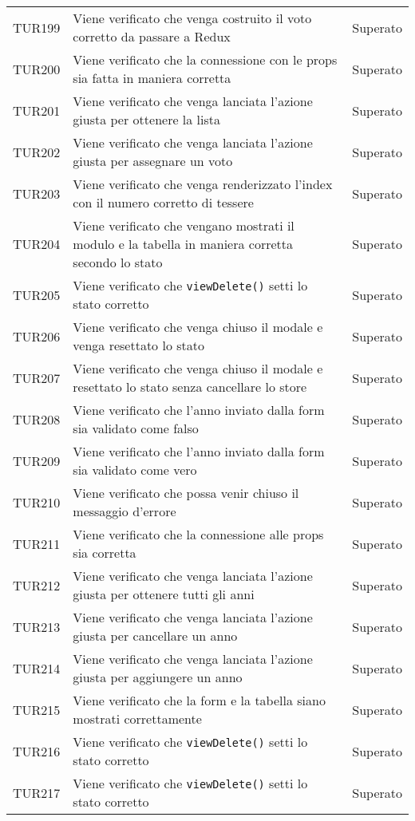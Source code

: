 \documentclass[PianoDiQualifica.tex]{subfiles}
\begin{document}
\begin{longtable}[H]{P{2cm}P{8.5cm}P{3cm}}
	TUR199 & Viene verificato che venga costruito il voto corretto da passare a Redux & Superato \\
	TUR200 & Viene verificato che la connessione con le props sia fatta in maniera corretta & Superato \\
	TUR201 & Viene verificato che venga lanciata l'azione giusta per ottenere la lista & Superato \\
	TUR202 & Viene verificato che venga lanciata l'azione giusta per assegnare un voto & Superato \\
	TUR203 & Viene verificato che venga renderizzato l'index con il numero corretto di tessere & Superato \\
	TUR204 & Viene verificato che vengano mostrati il modulo e la tabella in maniera corretta secondo lo stato & Superato \\
	TUR205 & Viene verificato che \texttt{viewDelete()} setti lo stato corretto & Superato \\
	TUR206 & Viene verificato che venga chiuso il modale e venga resettato lo stato & Superato \\
	TUR207 & Viene verificato che venga chiuso il modale e resettato lo stato senza cancellare lo store & Superato \\
	TUR208 & Viene verificato che l'anno inviato dalla form sia validato come falso & Superato \\
	TUR209 & Viene verificato che l'anno inviato dalla form sia validato come vero & Superato \\
	TUR210 & Viene verificato che possa venir chiuso il messaggio d'errore & Superato \\
	TUR211 & Viene verificato che la connessione alle props sia corretta & Superato \\
	TUR212 & Viene verificato che venga lanciata l'azione giusta per ottenere tutti gli anni & Superato \\
	TUR213 & Viene verificato che venga lanciata l'azione giusta per cancellare un anno & Superato \\
	TUR214 & Viene verificato che venga lanciata l'azione giusta per aggiungere un anno & Superato \\
	TUR215 & Viene verificato che la form e la tabella siano mostrati correttamente & Superato \\
	TUR216 & Viene verificato che \texttt{viewDelete()} setti lo stato corretto & Superato \\
	TUR217 & Viene verificato che \texttt{viewDelete()} setti lo stato corretto & Superato \\

\end{longtable}
\end{document}
